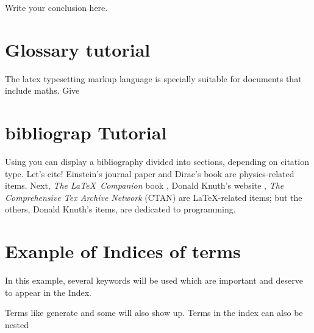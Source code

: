 Write your conclusion here.






\chapter{Glossary tutorial}

 The \Gls{latex} typesetting markup language is specially suitable 
for documents that include \gls{maths}. Give



\chapter{bibliograp Tutorial}

Using you can display a bibliography divided into sections, depending on citation type. 
Let's cite! Einstein's journal paper \cite{einstein} and Dirac's book \cite{dirac} are physics-related items. 
Next, \textit{The \LaTeX\ Companion} book \cite{latexcompanion}, Donald Knuth's website \cite{knuthwebsite}, \textit{The Comprehensive Tex Archive Network} (CTAN) \cite{ctan} are \LaTeX-related items; but the others, Donald Knuth's items, \cite{knuth-fa,knuth-acp} are dedicated to programming.



\chapter{Exanple of Indices of terms}

In this example, several keywords will be 
used which are important and deserve to appear in the 
Index.

Terms like generate and some 
will also show up. Terms in the index can also be 
nested 